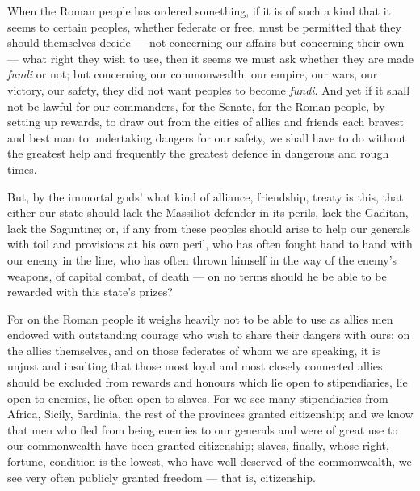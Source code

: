  When the Roman people has ordered something, if it is of such a kind that it seems to certain peoples, whether federate or free, must be permitted that they should themselves decide --- not concerning our affairs but concerning their own --- what right they wish to use, then it seems we must ask whether they are made \textit{fundi} or not; but concerning our commonwealth, our empire, our wars, our victory, our safety, they did not want peoples to become \textit{fundi}. And yet if it shall not be lawful for our commanders, for the Senate, for the Roman people, by setting up rewards, to draw out from the cities of allies and friends each bravest and best man to undertaking dangers for our safety, we shall have to do without the greatest help and frequently the greatest defence in dangerous and rough times.

 But, by the immortal gods! what kind of alliance, friendship, treaty is this, that either our state should lack the Massiliot defender in its perils, lack the Gaditan, lack the Saguntine; or, if any from these peoples should arise to help our generals with toil and provisions at his own peril, who has often fought hand to hand with our enemy in the line, who has often thrown himself in the way of the enemy's weapons, of capital combat, of death --- on no terms should he be able to be rewarded with this state's prizes?

 For on the Roman people it weighs heavily not to be able to use as allies men endowed with outstanding courage who wish to share their dangers with ours; on the allies themselves, and on those federates of whom we are speaking, it is unjust and insulting that those most loyal and most closely connected allies should be excluded from rewards and honours which lie open to stipendiaries, lie open to enemies, lie often open to slaves. For we see many stipendiaries from Africa, Sicily, Sardinia, the rest of the provinces granted citizenship; and we know that men who fled from being enemies to our generals and were of great use to our commonwealth have been granted citizenship; slaves, finally, whose right, fortune, condition is the lowest, who have well deserved of the commonwealth, we see very often publicly granted freedom --- that is, citizenship.

